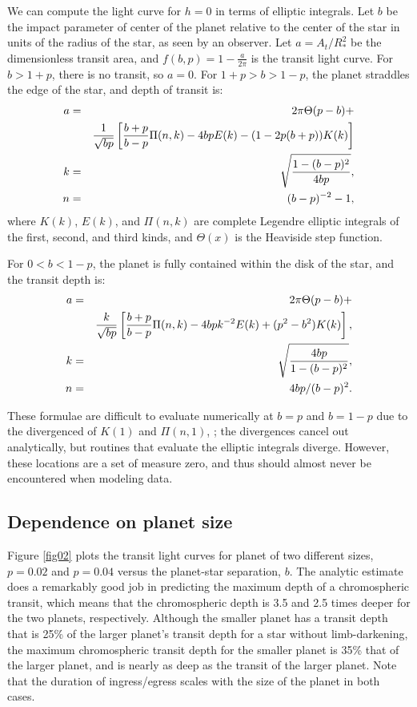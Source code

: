 \documentclass[manuscript]{aastex}
\begin{document}
We can compute the light curve for $h=0$ in terms of elliptic integrals.
Let $b$ be the impact parameter of center of the planet relative to
the center of the star in units of the radius of the star, as
seen by an observer.  Let $a = A_t/R_*^2$ be the dimensionless transit
area, and $f(b,p)=1-\frac{a}{2\pi}$ is the transit light curve.
For $b > 1+p$, there is no transit, so $a=0$.
For $1+p > b > 1-p$, the planet straddles the edge of the star, and
depth of transit is:
\begin{eqnarray}\label{ingress}
a&=&2\pi\Theta(p-b) +\\
&& {1\over \sqrt{bp}} \left[{b+p\over b-p}\Pi(n,k)-4bpE(k)-(1-2p(b+p))K(k)\right] \cr
k&=&\sqrt{1-(b-p)^2\over 4bp}, \cr 
n&=&(b-p)^{-2}-1,
\end{eqnarray}
where $K(k)$, $E(k)$, and $\Pi(n,k)$ are complete Legendre elliptic 
integrals of the first, second, and third kinds, and $\Theta(x)$ is
the Heaviside step function.

For $0 < b < 1-p$, the planet is fully contained within the disk of the star,
and the transit depth is:
\begin{eqnarray}\label{disk}
a&=&2\pi\Theta(p-b)+\\
&&{k\over \sqrt{bp}}\left[{b+p\over b-p}\Pi(n,k)-4bpk^{-2}E(k)
             +(p^2-b^2)K(k)\right],\cr
k&=&\sqrt{4bp\over 1-(b-p)^2},\cr
n&=&4bp/(b-p)^2.
\end{eqnarray}

These formulae are difficult to evaluate numerically at 
$b=p$ and $b=1-p$ due to the divergenced of $K(1)$ and $\Pi(n,1)$,
; the divergences cancel out analytically, but routines that
evaluate the elliptic integrals diverge.  However, these locations
are a set of measure zero, and thus should almost never be encountered
when modeling data.

\subsection{Dependence on planet size}

Figure \ref{fig02} plots the transit light curves for planet of
two different sizes, $p=0.02$ and $p=0.04$ versus the planet-star
separation, $b$.  The analytic estimate does a remarkably good
job in predicting the maximum depth of a chromospheric transit,
which means that the chromospheric depth is 3.5 and 2.5 times
deeper for the two planets, respectively.  Although the smaller
planet has a transit depth that is 25\% of the larger planet's
transit depth for a star without limb-darkening, the maximum 
chromospheric transit depth for the smaller planet is 35\% that 
of the larger planet, and is nearly as deep as the transit of 
the larger planet.  Note that the duration of ingress/egress 
scales with the size of the planet in both cases.  
\end{document}
